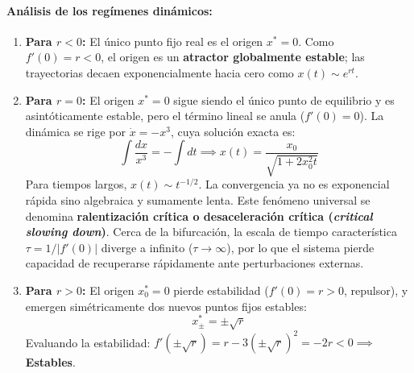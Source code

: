 \paragraph{Análisis de los regímenes dinámicos:}
\begin{enumerate}
    \item \textbf{Para $r < 0$:} El único punto fijo real es el origen $x^* = 0$. Como $f'(0) = r < 0$, el origen es un \textbf{atractor globalmente estable}; las trayectorias decaen exponencialmente hacia cero como $x(t) \sim e^{rt}$.
    \item \textbf{Para $r = 0$:} El origen $x^* = 0$ sigue siendo el único punto de equilibrio y es asintóticamente estable, pero el término lineal se anula ($f'(0) = 0$). La dinámica se rige por $\dot{x} = -x^3$, cuya solución exacta es:
    \begin{equation}
        \int \frac{dx}{x^3} = -\int dt \implies x(t) = \frac{x_0}{\sqrt{1 + 2x_0^2 t}}
    \end{equation}
    Para tiempos largos, $x(t) \sim t^{-1/2}$. La convergencia ya no es exponencial rápida sino algebraica y sumamente lenta. Este fenómeno universal se denomina \textbf{ralentización crítica o desaceleración crítica (\emph{critical slowing down})}. Cerca de la bifurcación, la escala de tiempo característica $\tau = 1/|f'(0)|$ diverge a infinito ($\tau \to \infty$), por lo que el sistema pierde capacidad de recuperarse rápidamente ante perturbaciones externas.
    \item \textbf{Para $r > 0$:} El origen $x_0^* = 0$ pierde estabilidad ($f'(0) = r > 0$, repulsor), y emergen simétricamente dos nuevos puntos fijos estables:
    \begin{equation}
        x_\pm^* = \pm\sqrt{r}
    \end{equation}
    Evaluando la estabilidad: $f'(\pm\sqrt{r}) = r - 3(\pm\sqrt{r})^2 = -2r < 0 \implies$ \textbf{Estables}.
\end{enumerate}

